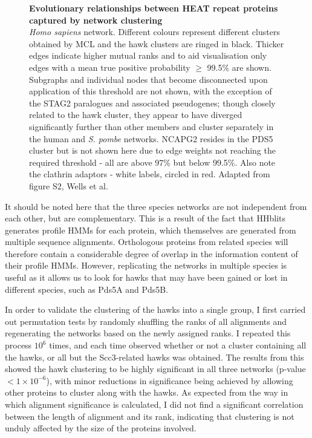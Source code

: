 \documentclass[a4paper,11pt,twoside,openright]{scrbook}
\begin{document}
\begin{figure}[h] 
        \caption[Evolutionary relationships between HEAT repeat proteins
        captured by network clustering]{\sffamily \textbf{Evolutionary
        relationships between HEAT repeat proteins captured by network
        clustering} \\ \small  \textit{Homo sapiens} network. Different colours
        represent different clusters obtained by MCL and the hawk clusters are
        ringed in black. Thicker edges indicate higher mutual ranks and to aid
        visualisation only edges with a mean true positive probability $\geq$
        99.5\% are shown. Subgraphs and individual nodes that become
        disconnected upon application of this threshold are not shown, with the
        exception of the STAG2 paralogues and associated pseudogenes; though
        closely related to the hawk cluster, they appear to have diverged
        significantly further than other members and cluster separately in the
        human and \textit{S. pombe} networks. NCAPG2 resides in the PDS5 cluster
        but is not shown here due to edge weights not reaching the required
        threshold - all are above 97\% but below 99.5\%. Also note the clathrin
        adaptors - white labels, circled in red. Adapted from figure S2, Wells
        et al. \cite{Wells2017}} \label{figure:clustering} \end{figure}

It should be noted here that the three species networks are not independent from
each other, but are complementary. This is a result of the fact that HHblits
generates profile HMMs for each protein, which themselves are generated from
multiple sequence alignments. Orthologous proteins from related species will
therefore contain a considerable degree of overlap in the information content of
their profile HMMs. However, replicating the networks in multiple species is
useful as it allows us to look for hawks that may have been gained or lost in
different species, such as Pds5A and Pds5B.

In order to validate the clustering of the hawks into a single group, I first
carried out permutation tests by randomly shuffling the ranks of all alignments
and regenerating the networks based on the newly assigned ranks. I repeated this
process $10^{6}$ times, and each time observed whether or not a cluster
containing all the hawks, or all but the Scc3-related hawks was obtained. The
results from this showed the hawk clustering to be highly significant in all
three networks (p-value $< 1 \times 10^{-6}$), with minor reductions in
significance being achieved by allowing other proteins to cluster along with the
hawks. As expected from the way in which alignment significance is calculated, I
did not find a significant correlation between the length of alignment and its
rank, indicating that clustering is not unduly affected by the size of the
proteins involved.
\end{document}
